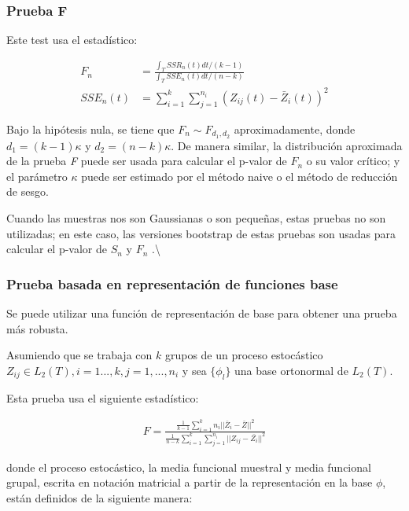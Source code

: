 \documentclass[
]{book}
\begin{document}
\hypertarget{prueba-f}{%
\subsubsection*{Prueba F}\label{prueba-f}}

Este test usa el estadístico:

\begin{align}
    F_n&=\frac{\int_T SSR_n(t)dt/(k-1)}{\int_T SSE_n(t)dt/(n-k)}\\
    SSE_n(t)&=\sum_{i=1}^k\sum_{j=1}^{n_i}(Z_{ij}(t)-\bar{Z}_i(t))^2
\end{align}

Bajo la hipótesis nula, se tiene que \(F_n \sim F_{d_1,d_2}\) aproximadamente, donde \(d_1=(k-1)\kappa\) y \(d_2=(n-k)\kappa\). De manera similar, la distribución aproximada de la prueba \textit{F} puede ser usada para calcular el p-valor de \(F_n\) o su valor crítico; y el parámetro \(\kappa\) puede ser estimado por el método naive o el método de reducción de sesgo.

Cuando las muestras nos son Gaussianas o son pequeñas, estas pruebas no son utilizadas; en este caso, las versiones bootstrap de estas pruebas son usadas para calcular el p-valor de \(S_n\) y \(F_n\) \citep{gorgi}.\textbackslash{}

\hypertarget{prueba-basada-en-representaciuxf3n-de-funciones-base}{%
\subsubsection*{Prueba basada en representación de funciones base}\label{prueba-basada-en-representaciuxf3n-de-funciones-base}}

Se puede utilizar una función de representación de base para obtener una prueba más robusta.

Asumiendo que se trabaja con \(k\) grupos de un proceso estocástico \(Z_{ij}\in L_2(T), i=1...,k,j=1,...,n_i\) y sea \(\{\phi_l\}\) una base ortonormal de \(L_2(T)\).

Esta prueba usa el siguiente estadístico:

\begin{align}
    F=\frac{\frac{1}{k-1}\sum_{i=1}^k n_i||\bar{Z}_i-\bar{Z}||^2}{\frac{1}{n-k}\sum_{i=1}^k\sum_{j=1}^{n_i} ||Z_{ij}-\bar{Z_i}||^2}
\end{align}

donde el proceso estocástico, la media funcional muestral y media funcional grupal, escrita en notación matricial a partir de la representación en la base \(\phi\), están definidos de la siguiente manera:
\end{document}
